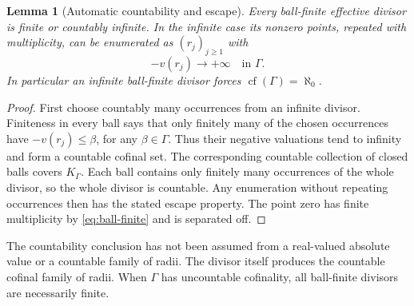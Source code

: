 \documentclass[11pt,letterpaper]{article}
\numberwithin{equation}{section}
\newtheorem{lemma}[theorem]{Lemma}
\theoremstyle{definition}
\theoremstyle{remark}
\newcommand{\cf}{\operatorname{cf}}
\begin{document}
\begin{lemma}[Automatic countability and escape]\label{lem:divisor-countable}
Every ball-finite effective divisor is finite or countably infinite.
In the infinite case its nonzero points, repeated with multiplicity, can be
enumerated as $(r_j)_{j\ge1}$ with
\[
 -v(r_j)\longrightarrow+\infty\quad\text{in }\Gamma.
\]
In particular an infinite ball-finite divisor forces
$\cf(\Gamma)=\aleph_0$.
\end{lemma}
\begin{proof}
First choose countably many occurrences from an infinite divisor. Finiteness
in every ball says that only finitely many of the chosen occurrences have
$-v(r_j)\le\beta$, for any $\beta\in\Gamma$. Thus their negative valuations
tend to infinity and form a countable cofinal set. The corresponding
countable collection of closed balls covers $K_\Gamma$. Each ball contains
only finitely many occurrences of the whole divisor, so the whole divisor is
countable. Any enumeration without repeating occurrences then has the stated
escape property. The point zero has finite multiplicity by
\eqref{eq:ball-finite} and is separated off.
\end{proof}

The countability conclusion has not been assumed from a real-valued absolute
value or a countable family of radii. The divisor itself produces the
countable cofinal family of radii. When $\Gamma$ has uncountable cofinality,
all ball-finite divisors are necessarily finite.
\end{document}
